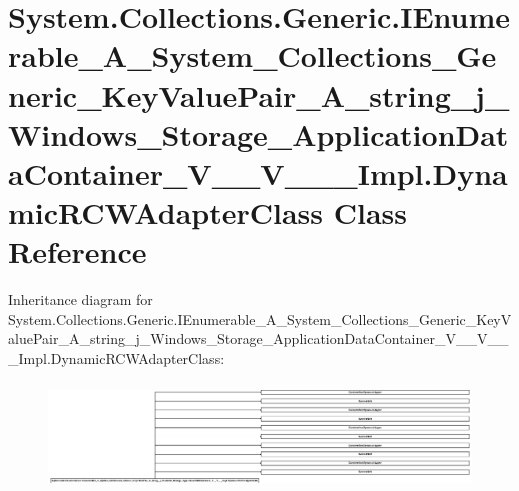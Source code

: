 \hypertarget{class_system_1_1_collections_1_1_generic_1_1_i_enumerable___a___system___collections___generic__d5c66cadca3b0fe72186b86f412252b0}{}\section{System.\+Collections.\+Generic.\+I\+Enumerable\+\_\+\+A\+\_\+\+System\+\_\+\+Collections\+\_\+\+Generic\+\_\+\+Key\+Value\+Pair\+\_\+\+A\+\_\+string\+\_\+j\+\_\+\+Windows\+\_\+\+Storage\+\_\+\+Application\+Data\+Container\+\_\+\+V\+\_\+\+\_\+\+V\+\_\+\+\_\+\+\_\+\+Impl.\+Dynamic\+R\+C\+W\+Adapter\+Class Class Reference}
\label{class_system_1_1_collections_1_1_generic_1_1_i_enumerable___a___system___collections___generic__d5c66cadca3b0fe72186b86f412252b0}
Inheritance diagram for System.\+Collections.\+Generic.\+I\+Enumerable\+\_\+\+A\+\_\+\+System\+\_\+\+Collections\+\_\+\+Generic\+\_\+\+Key\+Value\+Pair\+\_\+\+A\+\_\+string\+\_\+j\+\_\+\+Windows\+\_\+\+Storage\+\_\+\+Application\+Data\+Container\+\_\+\+V\+\_\+\+\_\+\+V\+\_\+\+\_\+\+\_\+\+Impl.\+Dynamic\+R\+C\+W\+Adapter\+Class\+:\begin{figure}[H]
\begin{center}
\leavevmode
\includegraphics[height=2.851852cm]{class_system_1_1_collections_1_1_generic_1_1_i_enumerable___a___system___collections___generic__d5c66cadca3b0fe72186b86f412252b0}
\end{center}
\end{figure}
